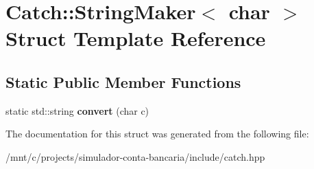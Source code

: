 \hypertarget{structCatch_1_1StringMaker_3_01char_01_4}{}\section{Catch\+:\+:String\+Maker$<$ char $>$ Struct Template Reference}
\label{structCatch_1_1StringMaker_3_01char_01_4}
\subsection*{Static Public Member Functions}
\begin{DoxyCompactItemize}
\item 
\mbox{\label{structCatch_1_1StringMaker_3_01char_01_4_a4e3db69a12bb83f3ef89251893e65da5}} 
static std\+::string {\bfseries convert} (char c)
\end{DoxyCompactItemize}


The documentation for this struct was generated from the following file\+:\begin{DoxyCompactItemize}
\item 
/mnt/c/projects/simulador-\/conta-\/bancaria/include/catch.\+hpp\end{DoxyCompactItemize}
